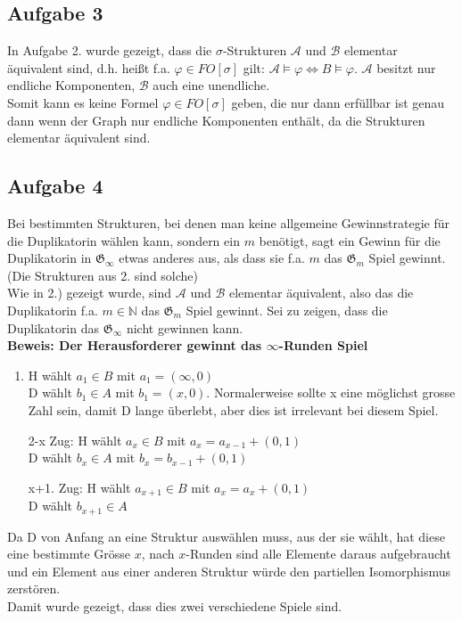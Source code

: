 \documentclass[a4paper,10pt]{article}
\newcommand{\N}{\mathbb{N}}
\begin{document}
	
\subsection*{Aufgabe 3}
In Aufgabe 2. wurde gezeigt, dass die $\sigma$-Strukturen $\mathcal{A}$ und $\mathcal{B}$ elementar äquivalent sind, d.h. heißt f.a. $\varphi \in FO[\sigma]$ gilt: $\mathcal{A} \vDash \varphi \Leftrightarrow B \vDash \varphi$. $\mathcal{A}$ besitzt nur endliche Komponenten, $\mathcal{B}$ auch eine unendliche. \\Somit kann es keine Formel $\varphi \in FO[\sigma]$ geben, die nur dann erfüllbar ist genau dann wenn der Graph nur endliche Komponenten enthält, da die Strukturen elementar äquivalent sind.


\subsection*{Aufgabe 4}

Bei bestimmten Strukturen, bei denen man keine allgemeine Gewinnstrategie für die Duplikatorin wählen kann, sondern ein $m$ benötigt, sagt ein Gewinn für die Duplikatorin in $\mathfrak{G}_{\infty}$ etwas anderes aus, als dass sie f.a. $m $ das $\mathfrak{G}_m$ Spiel gewinnt. (Die Strukturen aus 2. sind solche) \\

Wie in 2.) gezeigt wurde, sind $\mathcal{A}$ und $\mathcal{B}$ elementar äquivalent, also das die Duplikatorin f.a. $m \in \N$ das $\mathfrak{G}_m$ Spiel gewinnt.
Sei zu zeigen, dass die Duplikatorin das $\mathfrak{G}_{\infty}$ nicht gewinnen kann. \\

\textbf{Beweis: Der Herausforderer gewinnt das $\infty$-Runden Spiel}
		\begin{enumerate}[1. \text{Zug:}]
			\item  	H wählt $a_1 \in B$ mit $a_1 = (\infty, 0)$ \\
				D wählt $b_1 \in A$ mit $b_1 = (x,0)$. Normalerweise sollte x eine möglichst grosse Zahl sein, damit D lange überlebt, aber dies ist irrelevant bei diesem Spiel.
			\item[2-x Zug:] 	H wählt $a_x \in B$ mit $a_x = a_{x-1} + (0,1)$ \\
				D wählt $b_x \in A$ mit $b_x = b_{x-1} + (0,1)$

			\item[x+1. Zug:] 	H wählt $a_{x+1} \in B$ mit $a_x = a_{x} + (0,1)$ \\
						D wählt $b_{x+1} \in A$	
		\end{enumerate}
		Da D von Anfang an eine Struktur auswählen muss, aus der sie wählt, hat diese eine bestimmte Grösse $x$, nach $x$-Runden sind alle Elemente daraus aufgebraucht und ein Element aus einer anderen Struktur würde den partiellen Isomorphismus zerstören. \\

		Damit wurde gezeigt, dass dies zwei verschiedene Spiele sind.
\end{document}
